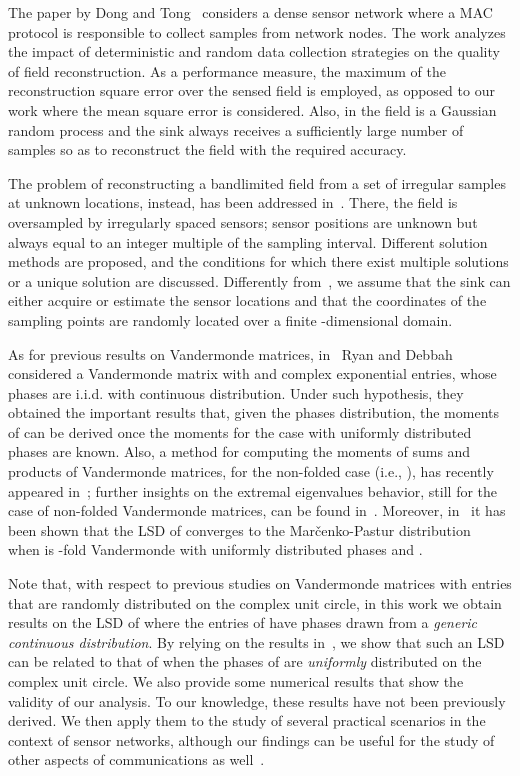 \documentclass[11pt, draftcls, onecolumn, a4paper]{IEEEtran}
\begin{document}
The paper by Dong and Tong~\cite{DongTong} considers a dense sensor
network where a MAC protocol is responsible to collect samples from
network nodes.  The work analyzes the impact of deterministic and
random data collection strategies on the quality of field
reconstruction.  As a performance measure, the maximum of the
reconstruction square error over the sensed field is employed, as
opposed to our work where the mean square error is considered. Also,
in \cite{DongTong} the field is a Gaussian random process and 
the sink always receives a sufficiently large number of samples
so as to reconstruct the field with the required accuracy.

The problem of reconstructing a bandlimited field from a 
set of irregular samples at unknown locations, instead, has been addressed
in~\cite{Marziliano00}. There, the field is oversampled by
irregularly spaced sensors; sensor positions are unknown but always
equal to an integer multiple of the sampling interval. Different
solution methods are proposed, and the conditions for which there
exist multiple solutions or a unique solution are discussed.
Differently from~\cite{Marziliano00}, we assume that the sink can
either acquire or estimate the sensor locations and that the
coordinates of the sampling points are randomly located over a finite
-dimensional domain.

As for previous results on Vandermonde matrices, in~\cite{RyanDebbah}
Ryan and Debbah considered a Vandermonde matrix  with  and
complex exponential entries, whose phases are i.i.d. with continuous
distribution. Under such hypothesis, they obtained the important
results that, given the phases distribution, the moments of
 can be derived once the moments for the case with
uniformly distributed phases are known.  Also, a method for computing
the moments of sums and products of Vandermonde matrices, for the
non-folded case (i.e., ), has recently appeared
in~\cite{ryan-2009}; further insights on the extremal eigenvalues
behavior, still for the case of non-folded Vandermonde matrices, can
be found in~\cite{Tucci2010}. Moreover, in~\cite{TSP2} it has been
shown that the LSD of  converges to the
Mar\v{c}enko-Pastur distribution~\cite{MarcenkoPastur} when  is
-fold Vandermonde with uniformly distributed phases and
.

Note that, with respect to previous studies on Vandermonde matrices with entries
that are randomly distributed on the complex unit circle, 
in this work we obtain results on
the LSD of  where the entries of  have phases drawn
from a {\em generic continuous distribution}. By relying on the
results in~\cite{TSP2,RyanDebbah}, we show that such an LSD can be related
to that of  when the phases of  are {\em uniformly}
distributed on the complex unit circle.  We also provide some
numerical results that show the validity of our analysis.  
To our knowledge, these results have not been previously derived.
We then apply them to the study of several practical scenarios in the 
context of sensor networks, 
although our findings can be useful for the study of other aspects 
of communications as well~\cite{RyanDebbah}.
\end{document}
